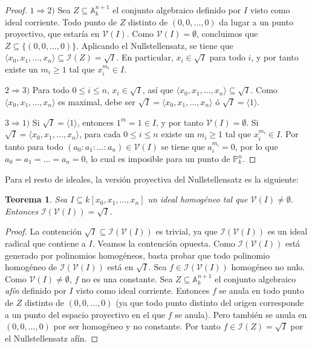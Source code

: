 \documentclass[a4paper,10pt]{book}
\newtheorem{thm}{Teorema}[chapter]
\newcommand{\AAA}{\mathbb A}
\newcommand{\PP}{\mathbb P}
\newcommand{\Pnk}{\PP^n_k}
\newcommand{\II}{{\mathcal I}}
\newcommand{\VV}{{\mathcal V}}
\begin{document}
\begin{proof}
$1\Rightarrow 2)$ Sea $Z\subseteq\AAA^{n+1}_k$ el conjunto algebraico definido por $I$ visto como ideal corriente. Todo punto de $Z$ distinto de $(0,0,\ldots,0)$ da lugar a un punto proyectivo, que estaría en $\VV(I)$. Como $\VV(I)=\emptyset$, concluimos que $Z\subseteq\{(0,0,\ldots,0)\}$. Aplicando el Nullstellensatz, se tiene que $\langle x_0,x_1,\ldots,x_n\rangle\subseteq\II(Z)=\sqrt{I}$. En particular, $x_i\in\sqrt{I}$ para todo $i$, y por tanto existe un $m_i\geq 1$ tal que $x_i^{m_i}\in I$.

$2\Rightarrow 3)$ Para todo $0\leq i\leq n$, $x_i\in \sqrt{I}$, así que $\langle x_0,x_1,\ldots,x_n\rangle\subseteq\sqrt{I}$. Como $\langle x_0,x_1,\ldots,x_n\rangle$ es maximal, debe ser $\sqrt{I}=\langle x_0,x_1,\ldots,x_n\rangle$ ó $\sqrt{I}=\langle 1\rangle$.

$3\Rightarrow 1)$ Si $\sqrt{I}=\langle 1\rangle$, entonces $1^m=1\in I$, y por tanto $\VV(I)=\emptyset$. Si $\sqrt{I}=\langle x_0,x_1,\ldots,x_n\rangle$, para cada $0\leq i\leq n$ existe un $m_i\geq 1$ tal que $x_i^{m_i}\in I$. Por tanto para todo $(a_0:a_1:\ldots:a_n)\in\VV(I)$ se tiene que $a_i^{m_i}=0$, por lo que $a_0=a_1=\ldots=a_n=0$, lo cual es imposible para un punto de $\Pnk$.
\end{proof}

Para el resto de ideales, la versión proyectiva del Nullstellensatz es la siguiente:


\begin{thm}
 Sea $I\subseteq k[x_0,x_1,\ldots,x_n]$ un ideal homogéneo tal que $\VV(I)\neq\emptyset$. Entonces $\II(\VV(I))=\sqrt{I}$.
\end{thm}

\begin{proof}
 La contención $\sqrt{I}\subseteq\II(\VV(I))$ es trivial, ya que $\II(\VV(I))$ es un ideal radical que contiene a $I$. Veamos la contención opuesta. Como $\II(\VV(I))$ está generado por polinomios homogéneos, basta probar que todo polinomio homogéneo de $\II(\VV(I))$ está en $\sqrt{I}$. Sea $f\in \II(\VV(I))$ homogéneo no nulo. Como $\VV(I)\neq \emptyset$, $f$ no es una constante. Sea $Z\subseteq\AAA^{n+1}_k$ el conjunto algebraico \emph{afín} definido por $I$ visto como ideal corriente. Entonces $f$ se anula en todo punto de $Z$ distinto de $(0,0,\ldots,0)$ (ya que todo punto distinto del origen corresponde a un punto del espacio proyectivo en el que $f$ se anula). Pero también se anula en $(0,0,\ldots,0)$ por ser homogéneo y no constante. Por tanto $f\in\II(Z)=\sqrt{I}$ por el Nullstellensatz afín.
\end{proof}
\end{document}
